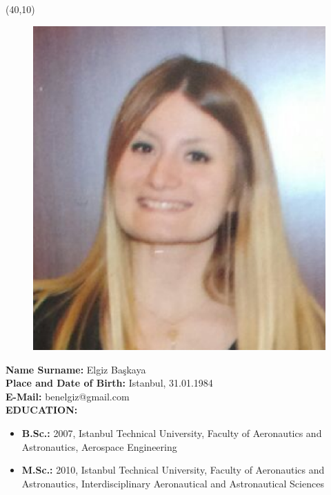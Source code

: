 \vspace{10mm}

\newsavebox{\mysquare}
\savebox{\mysquare}{\textcolor{black}{\rule[2.3pt]{3.4pt}{3.4pt}}}

\setlength{\TPHorizModule}{10pt}
\setlength{\TPVertModule}{10pt}
\begin{textblock}{1}(40,10)
 \begin{figure}[p]
 \includegraphics[scale=0.3,keepaspectratio=true]{elguz.eps}
\end{figure}

\end{textblock}
\textbf{Name Surname:} Elgiz Ba\c{s}kaya\\

\vspace{-3mm}
\textbf{Place and Date of Birth:} Istanbul, 31.01.1984\\

\vspace{-3mm}
\textbf{E-Mail:} benelgiz@gmail.com\\


\textbf{EDUCATION:} 
\vspace{-3mm}
\begin{itemize}
  \item \textbf{B.Sc.:} 2007, Istanbul Technical University, Faculty of Aeronautics and Astronautics, Aerospace Engineering
  \item \textbf{M.Sc.:} 2010, Istanbul Technical University, Faculty of Aeronautics and Astronautics, Interdisciplinary Aeronautical and Astronautical Sciences
\end{itemize}

